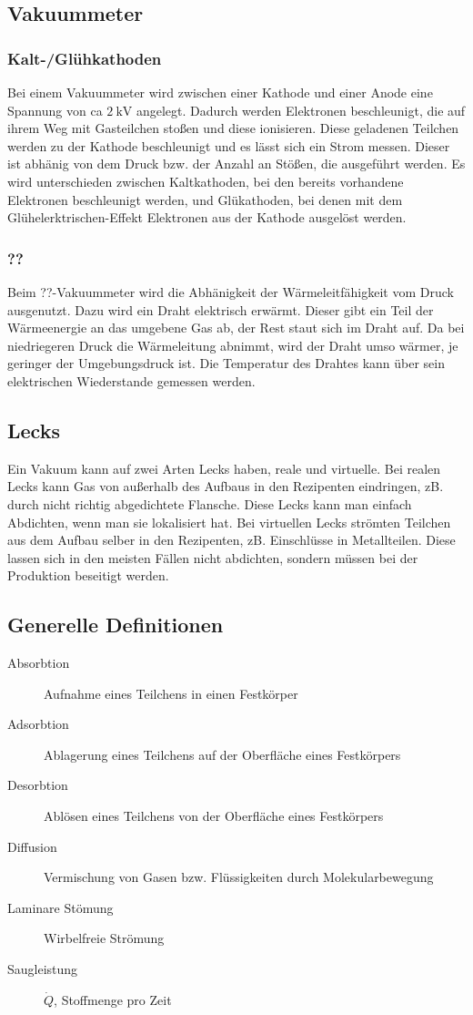 \subsection{Vakuummeter}
\subsubsection{Kalt-/Glühkathoden}
Bei einem Vakuummeter wird zwischen einer Kathode und einer Anode eine Spannung von ca $\SI{2}{\kilo \volt}$ angelegt. Dadurch werden Elektronen
beschleunigt, die auf ihrem Weg mit Gasteilchen stoßen und diese ionisieren. Diese geladenen Teilchen werden zu der Kathode beschleunigt und es lässt sich ein
Strom messen. Dieser ist abhänig von dem Druck bzw. der Anzahl an Stößen, die ausgeführt werden. Es wird unterschieden zwischen Kaltkathoden, bei den bereits
vorhandene Elektronen beschleunigt werden, und Glükathoden, bei denen mit dem Glühelerktrischen-Effekt Elektronen aus der Kathode ausgelöst werden.
\subsubsection{??}
Beim ??-Vakuummeter wird die Abhänigkeit der Wärmeleitfähigkeit vom Druck ausgenutzt. Dazu wird ein Draht elektrisch erwärmt. Dieser gibt ein Teil der
Wärmeenergie an das umgebene Gas ab, der Rest staut sich im Draht auf. Da bei niedriegeren Druck die Wärmeleitung abnimmt, wird der Draht umso wärmer, je
geringer der Umgebungsdruck ist. Die Temperatur des Drahtes kann über sein elektrischen Wiederstande gemessen werden.
\subsection{Lecks}
Ein Vakuum kann auf zwei Arten Lecks haben, reale und virtuelle. Bei realen Lecks kann Gas von außerhalb des Aufbaus in den Rezipenten eindringen, zB. durch
nicht richtig abgedichtete Flansche. Diese Lecks kann man einfach Abdichten, wenn man sie lokalisiert hat. Bei virtuellen Lecks strömten Teilchen aus dem
Aufbau selber in den Rezipenten, zB. Einschlüsse in Metallteilen. Diese lassen sich in den meisten Fällen nicht abdichten, sondern müssen bei der Produktion
beseitigt werden.
\subsection{Generelle Definitionen}
\begin{description}
	\item[Absorbtion] Aufnahme eines Teilchens in einen Festkörper
	\item[Adsorbtion] Ablagerung eines Teilchens auf der Oberfläche eines Festkörpers
	\item[Desorbtion] Ablösen eines Teilchens von der Oberfläche eines Festkörpers
	\item[Diffusion] Vermischung von Gasen bzw. Flüssigkeiten durch Molekularbewegung
	\item[Laminare Stömung] Wirbelfreie Strömung
	\item[Saugleistung] $\dot{Q}$, Stoffmenge pro Zeit
\end{description}

